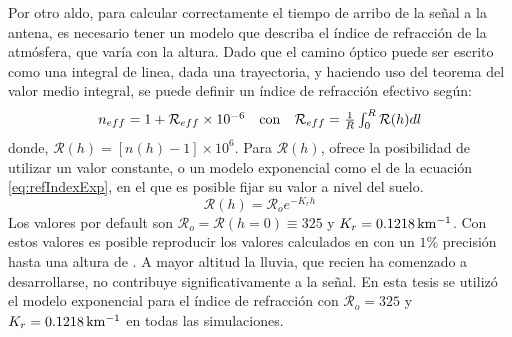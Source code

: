		Por otro aldo, para calcular correctamente el tiempo de arribo de la se\~nal a la antena, es necesario tener un modelo que describa el \'indice de refracci\'on de la atm\'osfera, que var\'ia con la altura.
		Dado que el camino \'optico puede ser escrito como una integral de linea, dada una trayectoria, y haciendo uso del teorema del valor medio integral, se puede definir un \'indice de refracci\'on efectivo seg\'un:
		\begin{equation}
			\begin{matrix}
			n_{eff}
			=
			1+{\mathcal R}_{eff}\times10^{-6}
			&
			{\rm con}
			&
			{\mathcal R}_{eff}
			=
			\frac{1}{R}\int_0^R{\mathcal R}(h)dl
			\end{matrix}
		\label{eq:refIndexEff}
		\end{equation}
		donde, ${\mathcal R}(h) = \left[ n(h)-1 \right] \times 10^6$.
		Para ${\mathcal R}(h)$, \zhs{} ofrece la posibilidad de utilizar un valor constante, o un modelo exponencial como el de la ecuaci\'on \ref{eq:refIndexExp}, en el que es posible fijar su valor a nivel del suelo.
		\begin{equation}
		{\mathcal R}(h)
		=
		{\mathcal R}_o
		e^{-K_rh}
		\label{eq:refIndexExp}
		\end{equation}
		Los valores por default son ${\mathcal R}_o={\mathcal R}(h=0)\equiv 325$ y $K_r=0.1218{\rm\, km^{-1}}$.
		Con estos valores es posible reproducir los valores calculados en \cite{gerson1948polar} con un $1\%$ precisi\'on hasta una altura de .
		A mayor altitud la lluvia, que recien ha comenzado a desarrollarse, no contribuye significativamente a la se\~nal.
		En esta tesis se utiliz\'o el modelo exponencial para el \'indice de refracci\'on con ${\mathcal R}_o=325$ y $K_r=0.1218{\rm\, km^{-1}}$ en todas las simulaciones.
		
